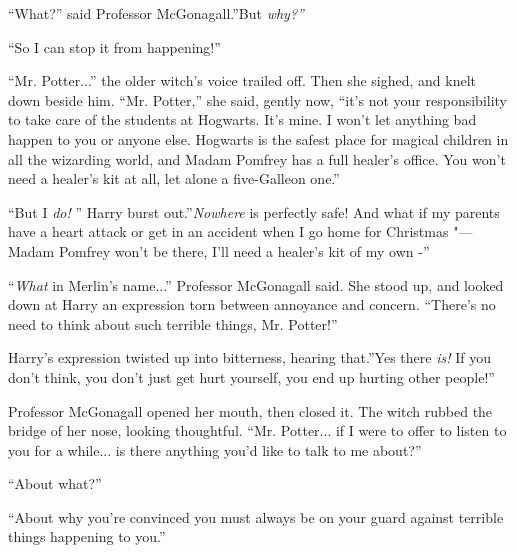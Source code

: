 ``What?'' said Professor McGonagall.''But \emph{why?''}

``So I can stop it from happening!''

``Mr. Potter...'' the older witch's voice trailed off. Then she
sighed, and knelt down beside him. ``Mr. Potter,'' she said, gently now,
``it's not your responsibility to take care of the students at Hogwarts.
It's mine. I won't let anything bad happen to you or anyone else.
Hogwarts is the safest place for magical children in all the wizarding
world, and Madam Pomfrey has a full healer's office. You won't need a
healer's kit at all, let alone a five-Galleon one.''

``But I \emph{do!} '' Harry burst out.''\emph{Nowhere} is perfectly safe!
And what if my parents have a heart attack or get in an accident when I
go home for Christmas "--- Madam Pomfrey won't be there, I'll need a
healer's kit of my own -''

``\emph{What} in Merlin's name...'' Professor McGonagall said. She
stood up, and looked down at Harry an expression torn between annoyance
and concern. ``There's no need to think about such terrible things, Mr.
Potter!''

Harry's expression twisted up into bitterness, hearing that.''Yes there
\emph{is!} If you don't think, you don't just get hurt yourself, you end
up hurting other people!''

Professor McGonagall opened her mouth, then closed it. The witch rubbed
the bridge of her nose, looking thoughtful. ``Mr. Potter... if I
were to offer to listen to you for a while... is there anything
you'd like to talk to me about?''

``About what?''

``About why you're convinced you must always be on your guard against
terrible things happening to you.''

